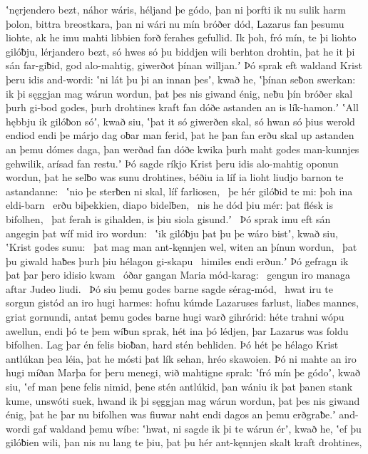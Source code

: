 ʽnęrjendero bezt, náhor wáris,
héljand þe gódo, þan ni þorfti ik nu sulik harm þolon,
bittra breostkara, þan ni wári nu mín bróðer dód,
Lazarus fan þesumu liohte, ak he imu mahti libbien forð
ferahes gefullid. Ik þoh, fró mín, te þi
liohto gilóƀju, lérjandero bezt,
só hwes só þu biddjen wili berhton drohtin,
þat he it þi sán far-giƀid, god alo-mahtig,
giwerðot þínan willjan.ʼ Þó sprak eft waldand Krist
þeru idis and-wordi: ʽni lát þu þi an innan þesʼ, kwað he,
ʽþínan seƀon swerkan: ik þi sęggjan mag
wárun wordun, þat þes nis giwand énig,
neƀu þín bróðer skal þurh gi-bod godes,
þurh drohtines kraft fan dóðe astanden
an is lík-hamon.ʼ ʽAll hębbju ik gilóƀon sóʼ, kwað siu,
ʽþat it só giwerðen skal, só hwan só þius werold endiod
endi þe márjo dag oƀar man ferid,
þat he þan fan erðu skal up astanden
an þemu dómes daga, þan werðad fan dóðe kwika
þurh maht godes man-kunnjes gehwilik,
arísad fan restu.ʼ Þó sagde ríkjo Krist
þeru idis alo-mahtig oponun wordun,
þat he selƀo was sunu drohtines,
béðiu ia líf ia lioht liudjo barnon
te astandanne: \hld\ ʽnio þe sterƀen ni skal,
líf farliosen, \hld\ þe hér gilóƀid te mi:
þoh ina eldi-barn \hld\ erðu biþekkien,
diapo bidelƀen, \hld\ nis he dód þiu mér:
þat flésk is bifolhen, \hld\ þat ferah is gihalden,
is þiu siola gisund.ʼ \hld\ Þó sprak imu eft sán angegin
þat wíf mid iro wordun: \hld\ ʽik gilóƀju þat þu þe wáro bistʼ, kwað siu,
ʽKrist godes sunu: \hld\ þat mag man ant-kęnnjen wel,
witen an þínun wordun, \hld\ þat þu giwald haƀes
þurh þiu hélagon gi-skapu \hld\ himiles endi erðun.ʼ
Þó gefragn ik þat þar þero idisio kwam \hld\ óðar gangan
Maria mód-karag: \hld\ gengun iro managa aftar
Judeo liudi. \hld\ Þó siu þemu godes barne
sagde sérag-mód, \hld\ hwat iru te sorgun gistód
an iro hugi harmes: hofnu kúmde
Lazaruses farlust, liaƀes mannes,
griat gornundi, antat þemu godes barne
hugi warð gihrórid: héte trahni
wópu awellun, endi þó te þem wíƀun sprak,
hét ina þó lédjen, þar Lazarus was
foldu bifolhen. Lag þar én felis bioƀan,
hard stén behliden. Þó hét þe hélago Krist
antlúkan þea léia, þat he mósti þat lík sehan,
hréo skawoien. Þó ni mahte an iro hugi míðan
Marþa for þeru menegi, wið mahtigne sprak:
ʽfró mín þe gódoʼ, kwað siu, ʽef man þene felis nimid,
þene stén antlúkid, þan wániu ik þat þanen stank kume,
unswóti suek, hwand ik þi sęggjan mag
wárun wordun, þat þes nis giwand énig,
þat he þar nu bifolhen was fiuwar naht endi dagos
an þemu erðgraƀe.ʼ and-wordi gaf
waldand þemu wíbe: ʽhwat, ni sagde ik þi te wárun érʼ, kwað he,
ʽef þu gilóƀien wili, þan nis nu lang te þiu,
þat þu hér ant-kęnnjen skalt kraft drohtines,
